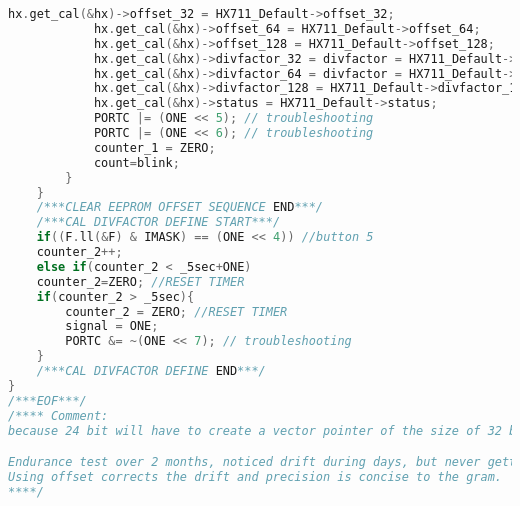 \begin{lstlisting}[language=C, caption={main.c}, label=main-c, captionpos=b]
			hx.get_cal(&hx)->offset_32 = HX711_Default->offset_32;
			hx.get_cal(&hx)->offset_64 = HX711_Default->offset_64;
			hx.get_cal(&hx)->offset_128 = HX711_Default->offset_128;
			hx.get_cal(&hx)->divfactor_32 = divfactor = HX711_Default->divfactor_32;
			hx.get_cal(&hx)->divfactor_64 = divfactor = HX711_Default->divfactor_64;
			hx.get_cal(&hx)->divfactor_128 = HX711_Default->divfactor_128;
			hx.get_cal(&hx)->status = HX711_Default->status;
			PORTC |= (ONE << 5); // troubleshooting
			PORTC |= (ONE << 6); // troubleshooting
			counter_1 = ZERO;
			count=blink;
		}
	}
	/***CLEAR EEPROM OFFSET SEQUENCE END***/
	/***CAL DIVFACTOR DEFINE START***/
	if((F.ll(&F) & IMASK) == (ONE << 4)) //button 5
	counter_2++;
	else if(counter_2 < _5sec+ONE)
	counter_2=ZERO; //RESET TIMER
	if(counter_2 > _5sec){
		counter_2 = ZERO; //RESET TIMER
		signal = ONE;
		PORTC &= ~(ONE << 7); // troubleshooting
	}
	/***CAL DIVFACTOR DEFINE END***/
}
/***EOF***/
/**** Comment:
because 24 bit will have to create a vector pointer of the size of 32 bit, then at the end do a cast to *((int32_t*)ptr).

Endurance test over 2 months, noticed drift during days, but never getting over 20 grams. For a scale using a 50Kg cell is Excellent.
Using offset corrects the drift and precision is concise to the gram.
****/
\end{lstlisting}


